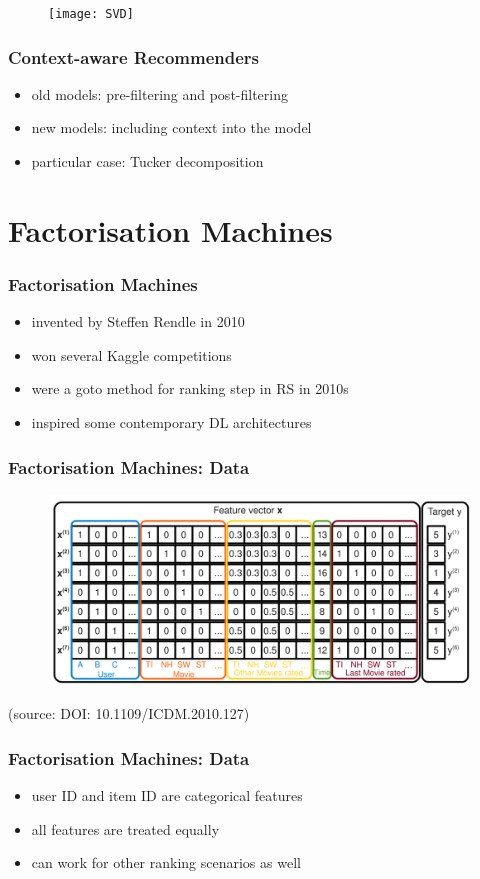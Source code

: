 \documentclass[t]{beamer}
\begin{document}
\begin{frame}
  \begin{figure}
  \texttt{[image: SVD]}
  \end{figure}
\end{frame}
\begin{frame}
  \frametitle{Context-aware Recommenders}
  \begin{itemize}
  \item old models: pre-filtering and post-filtering
  \item new models: including context into the model
  \item particular case: Tucker decomposition
  \end{itemize}
\end{frame}
\section{Factorisation Machines}
\begin{frame}
  \frametitle{Factorisation Machines}
  \begin{itemize}
  \item invented by Steffen Rendle in 2010
  \item won several Kaggle competitions
  \item were a goto method for ranking step in RS in 2010s
  \item inspired some contemporary DL architectures
  \end{itemize}
\end{frame}
\begin{frame}
  \frametitle{Factorisation Machines: Data}
  \begin{figure}
    \includegraphics[scale=0.17]{fm}
  \end{figure}
  (source: DOI: 10.1109/ICDM.2010.127)
\end{frame}
\begin{frame}
  \frametitle{Factorisation Machines: Data}
  \begin{itemize}
  \item user ID and item ID are categorical features
  \item all features are treated equally
  \item can work for other ranking scenarios as well
  \end{itemize}
\end{frame}
\end{document}
